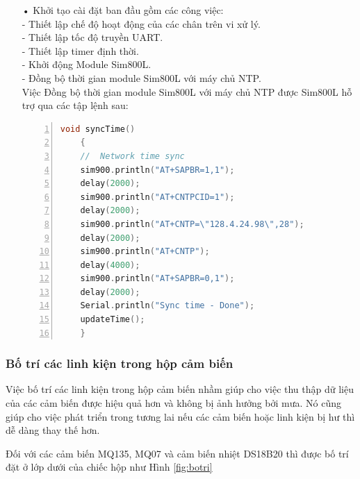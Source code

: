 \begin{itemize}
	\item[•]Khởi tạo cài đặt ban đầu gồm các công việc: \\
	- Thiết lập chế độ hoạt động của các chân trên vi xử lý.\\
	- Thiết lập tốc độ truyền UART.\\
	- Thiết lập timer định thời.\\
	- Khởi động Module Sim800L.\\
	- Đồng bộ thời gian module Sim800L với máy chủ NTP.\\
	
	Việc Đồng bộ thời gian module Sim800L với máy chủ NTP được Sim800L hỗ trợ qua các tập lệnh sau:
	\begin{lstlisting}[numbers=left,firstnumber=1,language=C]
	void syncTime()
	{
	//  Network time sync
	sim900.println("AT+SAPBR=1,1");
	delay(2000);
	sim900.println("AT+CNTPCID=1");
	delay(2000);
	sim900.println("AT+CNTP=\"128.4.24.98\",28");
	delay(2000);
	sim900.println("AT+CNTP");
	delay(4000);  
	sim900.println("AT+SAPBR=0,1");
	delay(2000);
	Serial.println("Sync time - Done");
	updateTime();
	}
	\end{lstlisting}
	
	
	
	
	
	
	
\end{itemize}









\subsubsection*{Bố trí các linh kiện trong hộp cảm biến}
Việc bố trí các linh kiện trong hộp cảm biến nhầm giúp cho việc thu thập dữ liệu của các cảm biến được hiệu quả hơn và không bị ảnh hưởng bởi mưa. Nó cũng giúp cho việc phát triển trong tương lai nếu các cảm biến hoặc linh kiện bị hư thì dễ dàng thay thế hơn.

Đối với các cảm biến MQ135, MQ07 và cảm biến nhiệt DS18B20 thì được bố trí đặt ở lớp dưới của chiếc hộp như Hình \ref{fig:botri}

